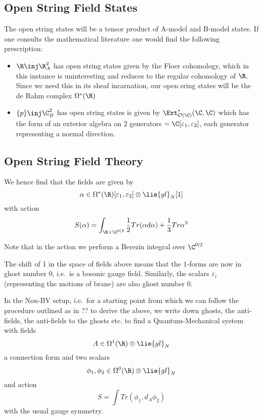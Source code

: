 \documentclass[12pt]{amsart}
\begin{document}
  \subsection{Open String Field States}
  The open string states will be a tensor product of A-model and B-model
  states. If one consults the mathematical literature one would find the
  following prescription:

  \begin{itemize}
    \item $\R \inj \R^2_A$ has open string states given by the Floer
      cohomology, which in this instance is uninteresting and reduces to the
      regular cohomology of $\R$. Since we need this in its sheaf incarnation,
      our open sring states will be the de Rahm complex $\Omega^*(\R)$
    \item $\{p\} \inj \C^2_B$ has open string states is given by
      $\Ext^*_{\mc{O}(\C)}(\C,\C)$ which has the form of an exterior algebra on
      2 generators $ = \C[\varepsilon_1,\varepsilon_2]$, each generator
      representing a normal direction.
  \end{itemize}

  \subsection{Open String Field Theory}

  We hence find that the fields\footnotemark{} are given by
  $$\alpha \in \Omega^*(\R)[\varepsilon_1,\varepsilon_2] \otimes
  \lie{gl}_N[1]$$ with action $$S(\alpha) = \int_{\R \times
  \C^{0|2}}\frac{1}{2}Tr(\alpha d\alpha) + \frac{1}{3} Tr \alpha^3$$

  \begin{rmk}
    Note that in the action we perform a Berezin integral over $\C^{0|2}$
  \end{rmk}
  \begin{rmk}
    The shift of 1 in the space of fields above means that the $1$-forms are
    now in ghost number 0, i.e.\ is a bosonic gauge field. Similarly, the
    scalars $\varepsilon_i$ (representing the motions of brane) are also ghost
    number 0.
  \end{rmk}

  \begin{rmk}
    In the Non-BV setup, i.e.\ for a starting point from which we can follow
    the procedure outlined as in ?? to derive the above, we write down ghosts,
    the anti-fields, the anti-fields to the ghosts etc. to find a Quantum-Mechanical system with fields
    $$A \in \Omega^1(\R)\otimes \lie{gl}_N$$ a connection form and two scalars
    $$\phi_1,\phi_2 \in \Omega^0(\R)\otimes\lie{gl}_N$$ and action $$S = \int
    Tr(\phi_1, d_A\phi_2)$$ with the usual gauge symmetry.
  \end{rmk}
\end{document}
